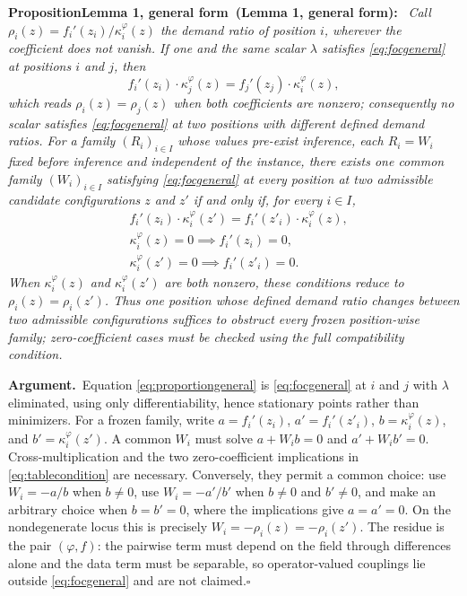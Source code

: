 \documentclass[twoside,11pt]{article}
\newenvironment{uprop}[1][]{\par\medskip\noindent\textbf{Proposition\ifx\relax#1\relax\else\ (#1)\fi:}\ \itshape}{\par\medskip}
\newcommand{\argument}{\par\medskip\noindent\textbf{Argument.}\ }
\newcommand{\qedbox}{\hfill$\square$}
\begin{document}
\begin{uprop}[Lemma 1, general form]
Call $\rho_i(z) = f_i'(z_i)/\kappa_i^{\varphi}(z)$ the \emph{demand ratio} of position $i$, wherever the coefficient does not vanish. If one and the same scalar $\lambda$ satisfies \eqref{eq:focgeneral} at positions $i$ and $j$, then
\begin{equation}
f_i'(z_i) \cdot \kappa_j^{\varphi}(z) = f_j'(z_j) \cdot \kappa_i^{\varphi}(z),
\label{eq:proportiongeneral}
\end{equation}
which reads $\rho_i(z) = \rho_j(z)$ when both coefficients are nonzero; consequently no scalar satisfies \eqref{eq:focgeneral} at two positions with different defined demand ratios. For a family $(R_i)_{i \in I}$ whose values pre-exist inference, each $R_i = W_i$ fixed before inference and independent of the instance, there exists one common family $(W_i)_{i\in I}$ satisfying \eqref{eq:focgeneral} at every position at two admissible candidate configurations $z$ and $z'$ if and only if, for every $i\in I$,
\begin{equation}
\begin{aligned}
& f_i'(z_i) \cdot \kappa_i^{\varphi}(z') = f_i'(z'_i) \cdot \kappa_i^{\varphi}(z), \\
& \kappa_i^{\varphi}(z)=0 \implies f_i'(z_i)=0, \\
& \kappa_i^{\varphi}(z')=0 \implies f_i'(z'_i)=0 .
\end{aligned}
\label{eq:tablecondition}
\end{equation}
When $\kappa_i^{\varphi}(z)$ and $\kappa_i^{\varphi}(z')$ are both nonzero, these conditions reduce to $\rho_i(z)=\rho_i(z')$. Thus one position whose defined demand ratio changes between two admissible configurations suffices to obstruct every frozen position-wise family; zero-coefficient cases must be checked using the full compatibility condition.
\end{uprop}

\argument Equation \eqref{eq:proportiongeneral} is \eqref{eq:focgeneral} at $i$ and $j$ with $\lambda$ eliminated, using only differentiability, hence stationary points rather than minimizers. For a frozen family, write $a=f_i'(z_i)$, $a'=f_i'(z'_i)$, $b=\kappa_i^{\varphi}(z)$, and $b'=\kappa_i^{\varphi}(z')$. A common $W_i$ must solve $a+W_ib=0$ and $a'+W_ib'=0$. Cross-multiplication and the two zero-coefficient implications in \eqref{eq:tablecondition} are necessary. Conversely, they permit a common choice: use $W_i=-a/b$ when $b\neq0$, use $W_i=-a'/b'$ when $b\neq0$ and $b'\neq0$, and make an arbitrary choice when $b=b'=0$, where the implications give $a=a'=0$. On the nondegenerate locus this is precisely $W_i=-\rho_i(z)=-\rho_i(z')$. The residue is the pair $(\varphi, f)$: the pairwise term must depend on the field through differences alone and the data term must be separable, so operator-valued couplings lie outside \eqref{eq:focgeneral} and are not claimed.\qedbox
\end{document}
